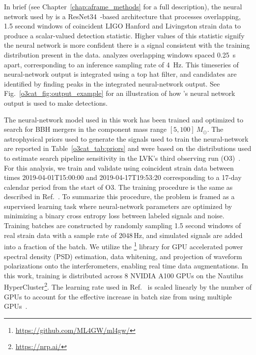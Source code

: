 \begin{refsection}
In brief (see Chapter~\ref{chap:aframe_methods} for a full description), the neural network used by \aframe is a ResNet34~\cite{resnet}-based architecture that processes overlapping, 1.5 second windows of coincident LIGO Hanford and Livingston strain data to produce a scalar-valued detection statistic. 
Higher values of this statistic signify the neural network is more confident there is a signal consistent with the training distribution present in the data. 
\aframe analyzes overlapping windows spaced 0.25~s apart, corresponding to an inference sampling rate of 4~Hz. 
This timeseries of neural-network output is integrated using a top hat filter, and candidates are identified by finding peaks in the integrated neural-network output. 
See Fig.~\ref{o3cat_fig:output_example} for an illustration of how \aframe's neural network output is used to make detections. 

The neural-network model used in this work has been trained and optimized to search for BBH mergers in the component mass range $[5, 100]~ M_\odot$. 
The astrophysical priors used to generate the signals used to train the neural-network are reported in Table~\ref{o3cat_tab:priors} and were based on the distributions used to estimate search pipeline sensitivity in the LVK's third observing run (O3)~\cite{ligo_scientific_collaboration_and_virgo_2023_7890437}. 
For this analysis, we train and validate \aframe using coincident strain data between times 2019-04-01T15:00:00 and 2019-04-17T19:53:20 corresponding to a 17-day calendar period from the start of O3. 
The training procedure is the same as described in Ref.~\cite{aframe-methods}. 
To summarize this procedure, the problem is framed as a supervised learning task where neural-network parameters are optimized by minimizing a binary cross entropy loss between labeled signals and noise. 
Training batches are constructed by randomly sampling 1.5 second windows of real strain data with a sample rate of 2048\,Hz, and simulated signals are added into a fraction of the batch. 
We utilize the \mlgw\footnote{\url{https://github.com/ML4GW/ml4gw/}} library for GPU accelerated power spectral density (PSD) estimation, data whitening, and projection of waveform polarizations onto the interferometers, enabling real time data augmentations.
In this work, training is distributed across 8 NVIDIA A100 GPUs on the Nautilus HyperCluster\footnote{\url{https://nrp.ai/}}. 
The learning rate used in Ref.~\cite{aframe-methods} is scaled linearly by the number of GPUs to account for the effective increase in batch size from using multiple GPUs~\cite{lr_scaling}.


\end{refsection}
